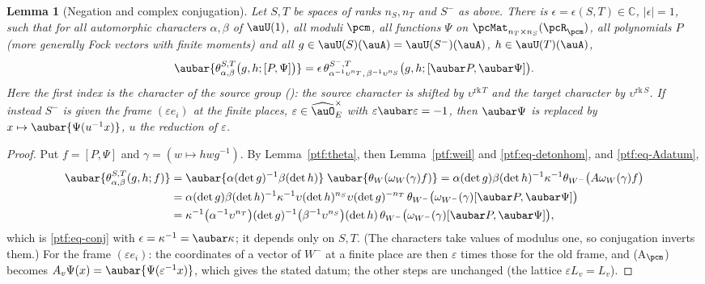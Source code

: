 \documentclass[10pt]{amsart}
\newtheorem{lemma}[theorem]{Lemma}
\theoremstyle{definition}
\theoremstyle{remark}
\newcommand{\C}{\mathbb C}
\begin{document}
\begin{lemma}[Negation and complex conjugation]\label{ptf:conj}
Let $S,T$ be spaces of ranks $n_S,n_T$ and $S^-$ as above. There is $\epsilon=\epsilon(S,T)\in\C$,
$|\epsilon|=1$, such that for all automorphic characters $\alpha,\beta$ of $\auU(1)$, all moduli $\pcm$, all
functions $\Psi$ on $\pcMat_{n_T\times n_S}(\pcR_\pcm)$, all polynomials $P$ (more generally Fock vectors
with finite moments) and all $g\in\auU(S)(\auA)=\auU(S^-)(\auA)$, $h\in\auU(T)(\auA)$,
\begin{equation}\label{ptf:eq-conj}
\aubar{\theta^{S,T}_{\alpha,\beta}\bigl(g,h;[P,\Psi]\bigr)}=\epsilon\,\theta^{S^-,T}_{\alpha^{-1}\upsilon^{n_T},\,
\beta^{-1}\upsilon^{n_S}}\bigl(g,h;[\aubar P,\aubar\Psi]\bigr).
\end{equation}
Here the first index is the character of the source group ({\cite[\S3.1.1]{P53}}): the source
character is shifted by $\upsilon^{\mathrm{rk}\,T}$ and the target character by $\upsilon^{\mathrm{rk}\,S}$.
If instead $S^-$ is given the frame $(\varepsilon e_i)$ at the finite places, $\varepsilon\in\widehat\auO_E^\times$
with $\varepsilon\aubar\varepsilon=-1$, then $\aubar\Psi$ is replaced by $x\mapsto\aubar{\Psi(u^{-1}x)}$, $u$ the
reduction of $\varepsilon$.
\end{lemma}
\begin{proof}
Put $f=[P,\Psi]$ and $\gamma=(w\mapsto hwg^{-1})$. By Lemma~\ref{ptf:theta}, then
Lemma~\ref{ptf:weil} and \eqref{ptf:eq-detonhom}, and \eqref{ptf:eq-Adatum},
\begin{align*}
\aubar{\theta^{S,T}_{\alpha,\beta}(g,h;f)}&=\aubar{\alpha(\det g)^{-1}\beta(\det h)}\;
\aubar{\theta_W(\omega_W(\gamma)f)}=\alpha(\det g)\beta(\det h)^{-1}\kappa^{-1}\theta_{W^-}\bigl(A\omega_W(\gamma)
f\bigr)\\
&=\alpha(\det g)\beta(\det h)^{-1}\kappa^{-1}\upsilon(\det h)^{n_S}\upsilon(\det g)^{-n_T}\,
\theta_{W^-}\bigl(\omega_{W^-}(\gamma)[\aubar P,\aubar\Psi]\bigr)\\
&=\kappa^{-1}\bigl(\alpha^{-1}\upsilon^{n_T}\bigr)(\det g)^{-1}\bigl(\beta^{-1}\upsilon^{n_S}\bigr)(\det h)\,
\theta_{W^-}\bigl(\omega_{W^-}(\gamma)[\aubar P,\aubar\Psi]\bigr),
\end{align*}
which is \eqref{ptf:eq-conj} with $\epsilon=\kappa^{-1}=\aubar\kappa$; it depends only on $S,T$. (The
characters take values of modulus one, so conjugation inverts them.) For the frame $(\varepsilon e_i)$:
the coordinates of a vector of $W^-$ at a finite place are then $\varepsilon$ times those for the old
frame, and (A$_\pcm$) becomes $A_v\Psi(x)=\aubar{\Psi(\varepsilon^{-1}x)}$, which gives the stated datum;
the other steps are unchanged (the lattice $\varepsilon L_v=L_v$).
\end{proof}
\end{document}
